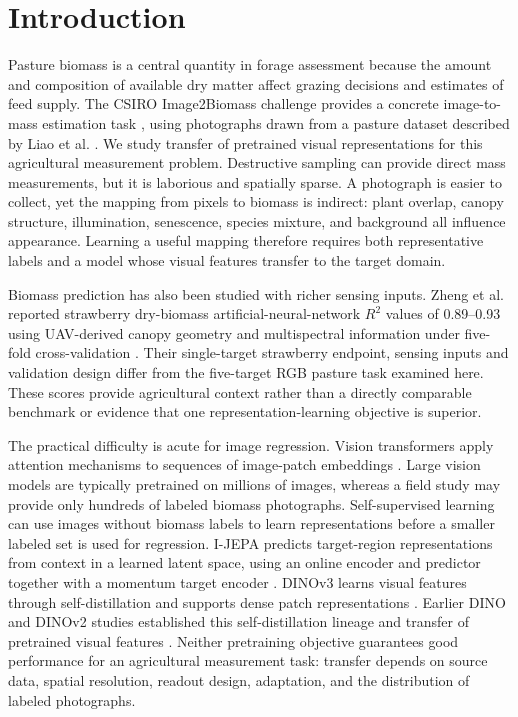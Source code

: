 \documentclass[pdflatex,a4paper,sn-nature]{sn-jnl}
\begin{document}
\section{Introduction}
Pasture biomass is a central quantity in forage assessment because the amount and composition of available dry matter affect grazing decisions and estimates of feed supply. The CSIRO Image2Biomass challenge provides a concrete image-to-mass estimation task \cite{csiro2025image2biomass}, using photographs drawn from a pasture dataset described by Liao et al. \cite{Liao2025PastureDataset}. We study transfer of pretrained visual representations for this agricultural measurement problem. Destructive sampling can provide direct mass measurements, but it is laborious and spatially sparse. A photograph is easier to collect, yet the mapping from pixels to biomass is indirect: plant overlap, canopy structure, illumination, senescence, species mixture, and background all influence appearance. Learning a useful mapping therefore requires both representative labels and a model whose visual features transfer to the target domain.

Biomass prediction has also been studied with richer sensing inputs. Zheng et al. reported strawberry dry-biomass artificial-neural-network $R^2$ values of 0.89--0.93 using UAV-derived canopy geometry and multispectral information under five-fold cross-validation \cite{zheng2022strawberry}. Their single-target strawberry endpoint, sensing inputs and validation design differ from the five-target RGB pasture task examined here. These scores provide agricultural context rather than a directly comparable benchmark or evidence that one representation-learning objective is superior.

The practical difficulty is acute for image regression. Vision transformers apply attention mechanisms to sequences of image-patch embeddings \cite{vaswani2017attention,dosovitskiy2021vit}. Large vision models are typically pretrained on millions of images, whereas a field study may provide only hundreds of labeled biomass photographs. Self-supervised learning can use images without biomass labels to learn representations before a smaller labeled set is used for regression. I-JEPA predicts target-region representations from context in a learned latent space, using an online encoder and predictor together with a momentum target encoder \cite{assran2023ijepa}. DINOv3 learns visual features through self-distillation and supports dense patch representations \cite{simeoni2025dinov3}. Earlier DINO and DINOv2 studies established this self-distillation lineage and transfer of pretrained visual features \cite{caron2021dino,oquab2024dinov2}. Neither pretraining objective guarantees good performance for an agricultural measurement task: transfer depends on source data, spatial resolution, readout design, adaptation, and the distribution of labeled photographs.
\end{document}
